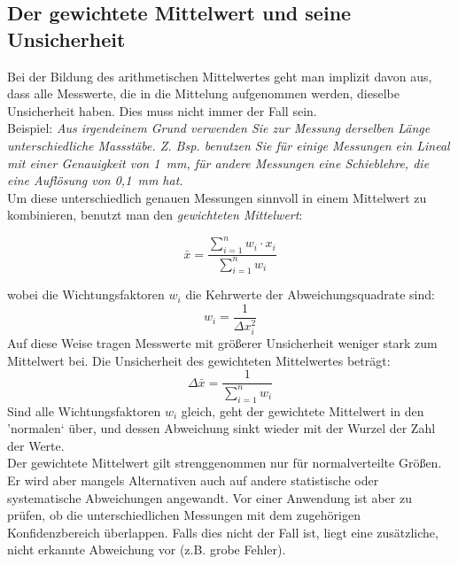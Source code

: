 \subsection{Der gewichtete Mittelwert und seine Unsicherheit}

Bei der Bildung des arithmetischen Mittelwertes geht man implizit davon aus, dass alle Messwerte, die in die Mittelung aufgenommen werden, dieselbe Unsicherheit haben. Dies muss nicht immer der Fall sein.\\

Beispiel: \textit{Aus irgendeinem Grund verwenden Sie zur Messung derselben Länge unterschiedliche Massstäbe. Z. Bsp. benutzen Sie für einige Messungen ein Lineal mit einer Genauigkeit von 1~mm, für andere Messungen eine Schieblehre, die eine Auflösung von 0,1~mm hat.}\\

Um diese unterschiedlich genauen Messungen sinnvoll in einem Mittelwert zu kombinieren, benutzt man den \textit{gewichteten Mittelwert}:
\begin{important}
	\begin{equation}
		\bar{x} = \frac{\sum_{i=1}^n{w_i\cdot x_i}}{\sum_{i=1}^n{w_i}}
	\end{equation}
\end{important}
wobei die Wichtungsfaktoren $w_i$ die Kehrwerte der Abweichungsquadrate sind:
\begin{equation*}
	w_i = \frac{1}{\Delta x_i^2}
\end{equation*}
Auf diese Weise tragen Messwerte mit größerer Unsicherheit weniger stark zum Mittelwert bei. Die Unsicherheit des gewichteten Mittelwertes beträgt:
\begin{equation}
	\Delta\bar{x} = \frac{1}{\sum_{i=1}^n{w_i}}
\end{equation}
Sind alle Wichtungsfaktoren $w_i$ gleich, geht der gewichtete Mittelwert in den 'normalen` über, und dessen Abweichung sinkt wieder mit der Wurzel der Zahl der Werte.\\

Der gewichtete Mittelwert gilt strenggenommen nur für normalverteilte Größen. Er wird aber mangels Alternativen auch auf andere statistische oder systematische Abweichungen angewandt. Vor einer Anwendung ist aber zu prüfen, ob die unterschiedlichen Messungen mit dem zugehörigen Konfidenzbereich überlappen. Falls dies nicht der Fall ist, liegt eine zusätzliche, nicht erkannte Abweichung vor (z.B. grobe Fehler).\\

